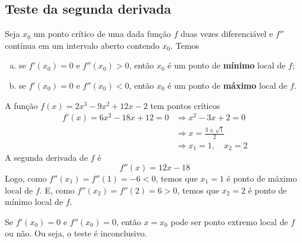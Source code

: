 \cleardoublepage\documentclass[../main.tex]{subfiles}
\begin{document}
\subsection{Teste da segunda derivada}
\begin{framed}
\begin{teo}
Seja $x_0$ um ponto crítico de uma dada função $f$ duas vezes diferenciável e $f''$ contínua em um intervalo aberto contendo $x_0$. Temos
\begin{enumerate}[a)]
\item se $f'(x_0) = 0$ e $f''(x_0) > 0$, então $x_0$ é um ponto de \textbf{mínimo} local de $f$;
\item se $f'(x_0) = 0$ e $f''(x_0) < 0$, então $x_0$ é um ponto de \textbf{máximo} local de $f$.
\end{enumerate}
\end{teo}\end{framed}
\begin{ex}
  A função $f(x) = 2x^3 - 9x^2 + 12x - 2$ tem pontos críticos
  \begin{align*}
    f'(x) = 6x^2 - 18x + 12 = 0 &\Rightarrow x^2 - 3x + 2 = 0 \\
                                &\Rightarrow x = \frac{3 \pm \sqrt{1}}{2}\\
                                &\Rightarrow x_1 = 1,\quad x_2 = 2
  \end{align*}
  A segunda derivada de $f$ é
  \begin{equation*}
    f''(x) = 12x - 18
  \end{equation*}
  Logo, como $f''(x_1) = f''(1) = -6 < 0$, temos que $x_1 = 1$ é ponto de máximo local de $f$. E, como $f''(x_2) = f''(2) = 6 > 0$, temos que $x_2 = 2$ é ponto de mínimo local de $f$.
\end{ex}

\begin{obs}
  Se $f'(x_0) = 0$ e $f''(x_0) = 0$, então $x=x_0$ pode ser ponto extremo local de $f$ ou não. Ou seja, o teste é inconclusivo.
\end{obs}
\end{document}
